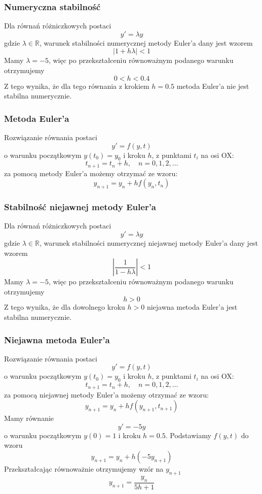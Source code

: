 \documentclass[11pt, leqno]{scrartcl}
\begin{document}
    \subsubsection{Numeryczna stabilność}
    Dla równań różniczkowych postaci
    \[
        y'=\lambda y
    \]
    gdzie $\lambda \in \mathbb{R}$, warunek stabilności
    numerycznej metody Euler'a dany jest wzorem
    \[
        |1+h\lambda|<1
    \]
    Mamy $\lambda =-5$, więc po przekształceniu równoważnym
    podanego warunku otrzymujemy
    \[
        0<h<0.4
    \]
    Z tego wynika, że dla tego równania z krokiem $h=0.5$
    metoda Euler'a nie jest stabilna numerycznie.

    \subsubsection{Metoda Euler'a}
    Rozwiązanie równania postaci
    \[
        y'=f(y,t)
    \]
    o warunku początkowym $y(t_0)=y_0$ i kroku $h$, z punktami
    $t_i$ na osi OX:
    \[
        t_{n+1}=t_n+h,\quad n=0,1,2,\dots
    \]
    za pomocą metody Euler'a możemy otrzymać ze wzoru:
    \[
        y_{n+1}=y_n+hf(y_n,t_n)
    \]
    
    \subsubsection{Stabilność niejawnej metody Euler'a}
    Dla równań różniczkowych postaci
    \[
        y'=\lambda y
    \]
    gdzie $\lambda \in \mathbb{R}$, warunek stabilności
    numerycznej niejawnej metody Euler'a dany jest wzorem
    \[
        \left| \frac{1}{1-h\lambda} \right| <1
    \]
    Mamy $\lambda =-5$, więc po przekształceniu równoważnym
    podanego warunku otrzymujemy
    \[
        h>0
    \]
    Z tego wynika, że dla dowolnego kroku $h>0$ niejawna metoda
    Euler'a jest stabilna numerycznie.

    \subsubsection{Niejawna metoda Euler'a}
    Rozwiązanie równania postaci
    \[
        y'=f(y,t)
    \]
    o warunku początkowym $y(t_0)=y_0$ i kroku $h$, z punktami
    $t_i$ na osi OX:
    \[
        t_{n+1}=t_n+h,\quad n=0,1,2,\dots
    \]
    za pomocą niejawnej metody Euler'a możemy otrzymać ze
    wzoru:
    \[
        y_{n+1}=y_n+hf(y_{n+1},t_{n+1})
    \]
    Mamy równanie
    \[
        y'=-5y
    \]
    o warunku początkowym $y(0)=1$ i kroku $h=0.5$.
    Podstawiamy $f(y,t)$ do wzoru
    \[
        y_{n+1}=y_n+h(-5y_{n+1})
    \]
    Przekształcając równoważnie otrzymujemy wzór na $y_{n+1}$
    \[
        y_{n+1}=\frac{y_n}{5h+1}
    \]
    
\end{document}

